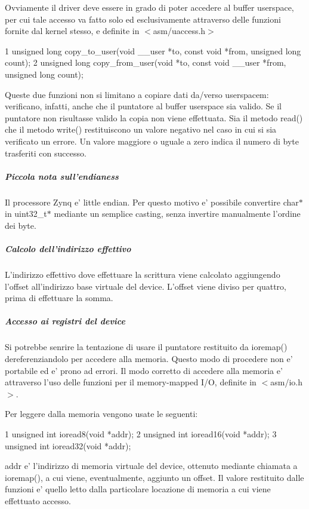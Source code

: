 Ovviamente il driver deve essere in grado di poter accedere al buffer userspace, per cui tale accesso va fatto solo ed esclusivamente attraverso delle funzioni fornite dal kernel stesso, e definite in $<$asm/uaccess.\+h$>$ 
\begin{DoxyCode}
1 unsigned long copy\_to\_user(void \_\_user *to, const void *from, unsigned long count);
2 unsigned long copy\_from\_user(void *to, const void \_\_user *from, unsigned long count);
\end{DoxyCode}
 Queste due funzioni non si limitano a copiare dati da/verso userspacem\+: verificano, infatti, anche che il puntatore al buffer userspace sia valido. Se il puntatore non risultasse valido la copia non viene effettuata. Sia il metodo read() che il metodo write() restituiscono un valore negativo nel caso in cui si sia verificato un errore. Un valore maggiore o uguale a zero indica il numero di byte trasferiti con successo.

\subparagraph*{Piccola nota sull'endianess}

Il processore Zynq e' little endian. Per questo motivo e' possibile convertire char$\ast$ in uint32\+\_\+t$\ast$ mediante un semplice casting, senza invertire manualmente l'ordine dei byte.

\subparagraph*{Calcolo dell'indirizzo effettivo}

L'indirizzo effettivo dove effettuare la scrittura viene calcolato aggiungendo l'offset all'indirizzo base virtuale del device. L'offset viene diviso per quattro, prima di effettuare la somma.

\subparagraph*{Accesso ai registri del device}

Si potrebbe senrire la tentazione di usare il puntatore restituito da ioremap() dereferenziandolo per accedere alla memoria. Questo modo di procedere non e' portabile ed e' prono ad errori. Il modo corretto di accedere alla memoria e' attraverso l'uso delle funzioni per il memory-\/mapped I/\+O, definite in $<$asm/io.\+h$>$.

Per leggere dalla memoria vengono usate le seguenti\+:


\begin{DoxyCode}
1 unsigned int ioread8(void *addr);
2 unsigned int ioread16(void *addr);
3 unsigned int ioread32(void *addr);
\end{DoxyCode}


addr e' l'indirizzo di memoria virtuale del device, ottenuto mediante chiamata a ioremap(), a cui viene, eventualmente, aggiunto un offset. Il valore restituito dalle funzioni e' quello letto dalla particolare locazione di memoria a cui viene effettuato accesso.

